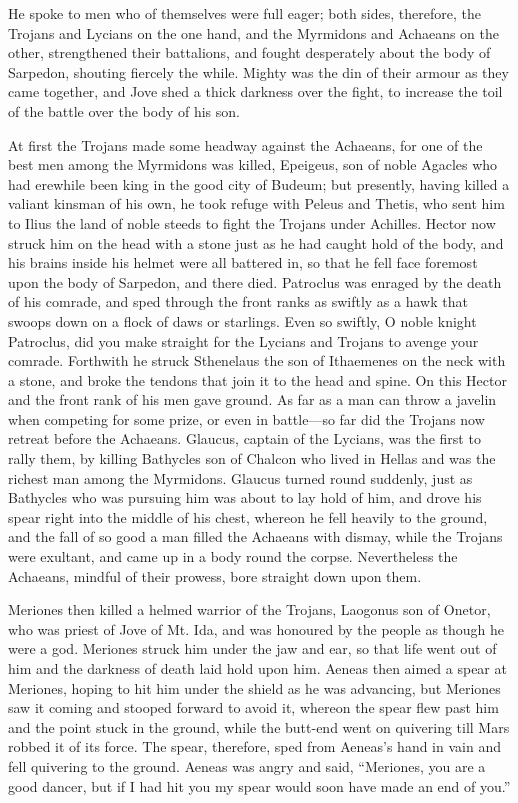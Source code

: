 He spoke to men who of themselves were full eager; both sides, therefore,
the Trojans and Lycians on the one hand, and the Myrmidons and Achaeans on
the other, strengthened their battalions, and fought desperately about the
body of Sarpedon, shouting fiercely the while. Mighty was the din of their
armour as they came together, and Jove shed a thick darkness over the
fight, to increase the toil of the battle over the body of his son.

At first the Trojans made some headway against the Achaeans, for one of
the best men among the Myrmidons was killed, Epeigeus, son of noble
Agacles who had erewhile been king in the good city of Budeum; but
presently, having killed a valiant kinsman of his own, he took refuge with
Peleus and Thetis, who sent him to Ilius the land of noble steeds to fight
the Trojans under Achilles. Hector now struck him on the head with a stone
just as he had caught hold of the body, and his brains inside his helmet
were all battered in, so that he fell face foremost upon the body of
Sarpedon, and there died. Patroclus was enraged by the death of his
comrade, and sped through the front ranks as swiftly as a hawk that swoops
down on a flock of daws or starlings. Even so swiftly, O noble knight
Patroclus, did you make straight for the Lycians and Trojans to avenge
your comrade. Forthwith he struck Sthenelaus the son of Ithaemenes on the
neck with a stone, and broke the tendons that join it to the head and
spine. On this Hector and the front rank of his men gave ground. As far as
a man can throw a javelin when competing for some prize, or even in battle—so
far did the Trojans now retreat before the Achaeans. Glaucus, captain of
the Lycians, was the first to rally them, by killing Bathycles son of
Chalcon who lived in Hellas and was the richest man among the Myrmidons.
Glaucus turned round suddenly, just as Bathycles who was pursuing him was
about to lay hold of him, and drove his spear right into the middle of his
chest, whereon he fell heavily to the ground, and the fall of so good a
man filled the Achaeans with dismay, while the Trojans were exultant, and
came up in a body round the corpse. Nevertheless the Achaeans, mindful of
their prowess, bore straight down upon them.

Meriones then killed a helmed warrior of the Trojans, Laogonus son of
Onetor, who was priest of Jove of Mt. Ida, and was honoured by the people
as though he were a god. Meriones struck him under the jaw and ear, so
that life went out of him and the darkness of death laid hold upon him.
Aeneas then aimed a spear at Meriones, hoping to hit him under the shield
as he was advancing, but Meriones saw it coming and stooped forward to
avoid it, whereon the spear flew past him and the point stuck in the
ground, while the butt-end went on quivering till Mars robbed it of its
force. The spear, therefore, sped from Aeneas’s hand in vain and fell
quivering to the ground. Aeneas was angry and said, “Meriones, you are a
good dancer, but if I had hit you my spear would soon have made an end of
you.”

